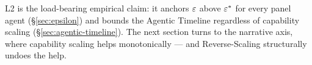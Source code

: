 L2 is the load-bearing empirical claim: it anchors $\varepsilon$ above $\varepsilon^{*}$ for every panel agent (\S\ref{sec:epsilon}) and bounds the Agentic Timeline regardless of capability scaling (\S\ref{sec:agentic-timeline}). The next section turns to the narrative axis, where capability scaling helps monotonically --- and Reverse-Scaling structurally undoes the help.
